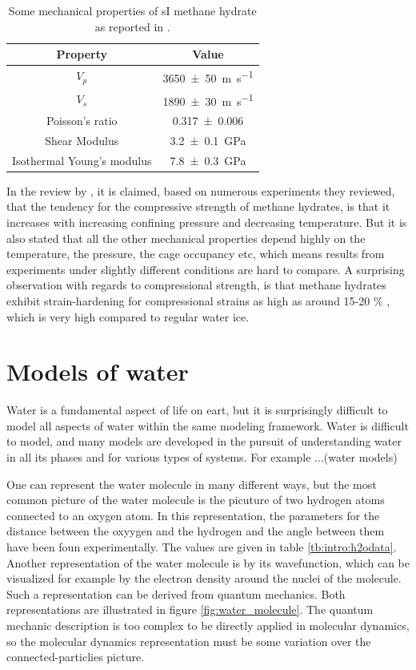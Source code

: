 \begin{table}
\caption{Some mechanical properties of sI methane hydrate as reported in \cite{Waite2000}.}
\label{tbl:si_mech_exp}
\centering
\begin{tabular}{c|c}
Property & Value \\
\hline
$V_p$ & \SI{3650\pm 50}{\meter\per\second} \\
$V_s$ & \SI{1890\pm 30}{\meter\per\second} \\
Poisson's ratio & \SI{0.317 \pm 0.006}{} \\
Shear Modulus & \SI{3.2\pm0.1}{\giga\pascal} \\
Isothermal Young's modulus & \SI{7.8\pm 0.3}{\giga\pascal}
\end{tabular}
\end{table}

In the review by \citet{Ning2012}, it is claimed, based on numerous experiments they reviewed, that the tendency for the compressive strength of methane hydrates, is that it increases with increasing confining pressure and decreasing temperature. But it is also stated that all the other mechanical properties depend highly on the temperature, the pressure, the cage occupancy etc, which means results from experiments under slightly different conditions are hard to compare. A surprising observation with regards to compressional strength, is that methane hydrates exhibit strain-hardening for compressional strains as high as around 15-20 \% \cite{Durham2003, Stern1998}, which is very high compared to regular water ice.

\section{Models of water}
Water is a fundamental aspect of life on eart, but it is surprisingly difficult to model all aspects of water within the same modeling framework. Water is difficult to model, and many models are developed in the pursuit of understanding water in all its phases and for various types of systems. For example ...(water models) 

One can represent the water molecule in many different ways, but the most common picture of the water molecule is the picuture of two hydrogen atoms connected to an oxygen atom. In this representation, the parameters for the distance between the oxyygen and the hydrogen and the angle between them have been foun experimentally. The values are given in table \ref{tb:intro:h2odata}. Another representation of the water molecule is by its wavefunction, which can be visualized for example by the electron density around the nuclei of the molecule. Such a representation can be derived from quantum mechanics. Both representations are illustrated in figure \ref{fig:water_molecule}. The quantum mechanic description is too complex to be directly applied in molecular dynamics, so the molecular dynamics representation must be some variation over the connected-particlies picture. 


